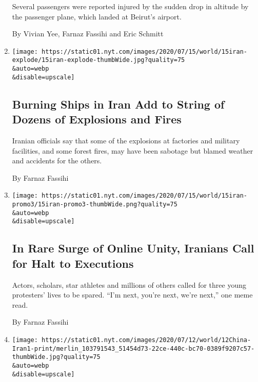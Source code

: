 \begin{enumerate}
  Several passengers were reported injured by the sudden drop in
  altitude by the passenger plane, which landed at Beirut's airport.

  By Vivian Yee, Farnaz Fassihi and Eric Schmitt
\item
  \href{/2020/07/15/world/middleeast/iran-ships-fire-explosions.html}{}

  \texttt{[image: https://static01.nyt.com/images/2020/07/15/world/15iran-explode/15iran-explode-thumbWide.jpg?quality=75\\\&auto=webp\\\&disable=upscale]}

  \hypertarget{burning-ships-in-iran-add-to-string-of-dozens-of-explosions-and-fires}{%
  \subsection{Burning Ships in Iran Add to String of Dozens of
  Explosions and
  Fires}\label{burning-ships-in-iran-add-to-string-of-dozens-of-explosions-and-fires}}

  Iranian officials say that some of the explosions at factories and
  military facilities, and some forest fires, may have been sabotage but
  blamed weather and accidents for the others.

  By Farnaz Fassihi
\item
  \href{/2020/07/15/world/middleeast/iran-protests-capital-punishment.html}{}

  \texttt{[image: https://static01.nyt.com/images/2020/07/15/world/15iran-promo3/15iran-promo3-thumbWide.png?quality=75\\\&auto=webp\\\&disable=upscale]}

  \hypertarget{in-rare-surge-of-online-unity-iranians-call-for-halt-to-executions}{%
  \subsection{In Rare Surge of Online Unity, Iranians Call for Halt to
  Executions}\label{in-rare-surge-of-online-unity-iranians-call-for-halt-to-executions}}

  Actors, scholars, star athletes and millions of others called for
  three young protesters' lives to be spared. ``I'm next, you're next,
  we're next,'' one meme read.

  By Farnaz Fassihi
\item
  \href{/2020/07/11/world/asia/china-iran-trade-military-deal.html}{}

  \texttt{[image: https://static01.nyt.com/images/2020/07/12/world/12China-Iran1-print/merlin\_103791543\_51454d73-22ce-440c-bc70-0389f9207c57-thumbWide.jpg?quality=75\\\&auto=webp\\\&disable=upscale]}


\end{enumerate}
